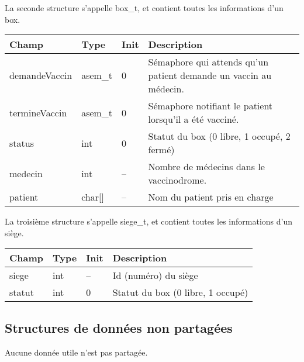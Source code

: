 \documentclass[a4paper]{article}
\makeatletter
\newenvironment{expl}{%
  \begin{list}{}{%
    \small\itshape%
    \topsep\z@%
    \listparindent0pt%
    \parsep0.75\baselineskip%
    \setlength{\leftmargin}{20mm}%
    \setlength{\rightmargin}{20mm}%
  }
    \item[]}%
    {\end{list}}
\makeatother
\begin{document}
\begin{expl}
\begin{tabularx}{\linewidth}{|l|l|l|X|}
    \end{tabularx}

    \newpage

    La seconde structure s'appelle box\_t, et contient toutes les informations d'un box.

    \begin{tabularx}{\linewidth}{|l|l|l|X|}
      \hline
      Champ & Type & Init & Description \\ \hline%
      demandeVaccin & asem\_t & 0 & Sémaphore qui attends qu'un patient demande un vaccin au médecin. \\ \hline%
      termineVaccin & asem\_t & 0 & Sémaphore notifiant le patient lorsqu'il a été vacciné. \\ \hline%
      status & int & 0 & Statut du box (0 libre, 1 occupé, 2 fermé) \\ \hline%
      medecin & int & -- & Nombre de médecins dans le vaccinodrome. \\ \hline%
      patient & char[] & -- & Nom du patient pris en charge \\ \hline%

    \end{tabularx}

    La troisième structure s'appelle siege\_t, et contient toutes les informations d'un siège.

    \begin{tabularx}{\linewidth}{|l|l|l|X|}
      \hline
      Champ & Type & Init & Description \\ \hline%
      siege & int & -- & Id (numéro) du siège \\ \hline%
      statut & int & 0 & Statut du box (0 libre, 1 occupé) \\ \hline%

    \end{tabularx}

  \end{expl}

  \subsection{Structures de données non partagées}

  \begin{expl}
    Aucune donnée utile n'est pas partagée.
  \end{expl}
\end{document}
